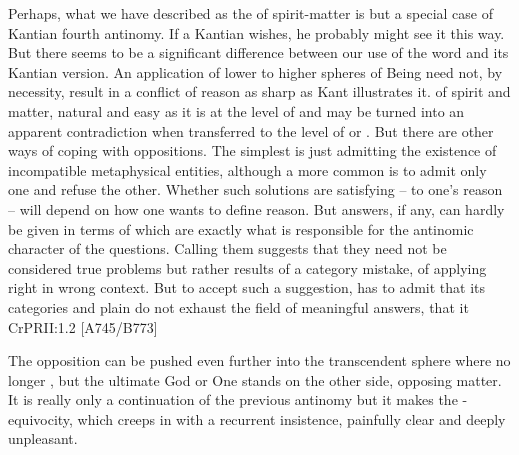 \pa Perhaps, what we have described as the  of spirit-matter is but
a special case of Kantian fourth antinomy. If a Kantian
wishes, he probably might see it this way. But there seems to be a
significant difference between our use of the word  and
its Kantian version.  An application of lower  to
higher spheres of Being need not, by necessity, result in a conflict
of reason as sharp as Kant illustrates it.  of spirit
and matter, natural and easy as it is at the level of 
and  may be turned into an apparent contradiction when
transferred to the level of  or . But there
are other ways of coping with  oppositions. The
simplest is just admitting the existence of incompatible metaphysical
entities, although a more common is to admit only one and refuse the
other. Whether such solutions are satisfying -- to one's reason
 -- will depend on how one wants to define reason. But answers, if any, can hardly be
 given in terms of  which are exactly what is
 responsible for the antinomic character of the questions.
Calling them 
suggests that they need not be considered true problems but rather results of
a category mistake, of applying right  in wrong context. But to
accept such a suggestion,  has to 
admit that its  categories and plain  do not
exhaust the field of meaningful answers, that it
  \citet{is benefited by the examination of a subject on both sides, and
    its judgments are corrected by being limited. [...] For it is perfectly
    permissible to employ, in the presence of reason, the language of a firmly
    rooted faith, even after we have been obliged to renounce all pretensions to
    knowledge.}{CrPR}{II:1.2 [A745/B773]}
\vspace*{-1.5ex}

\label{sub:Godmatter}\vspace*{-1ex}
\pa
The opposition can be pushed even further into the transcendent sphere where no
longer , but the ultimate God or One stands on the other side, 
opposing matter. It is really only a continuation of the previous antinomy but
it makes the - equivocity, which creeps in with a
recurrent insistence, painfully clear and deeply unpleasant. 

